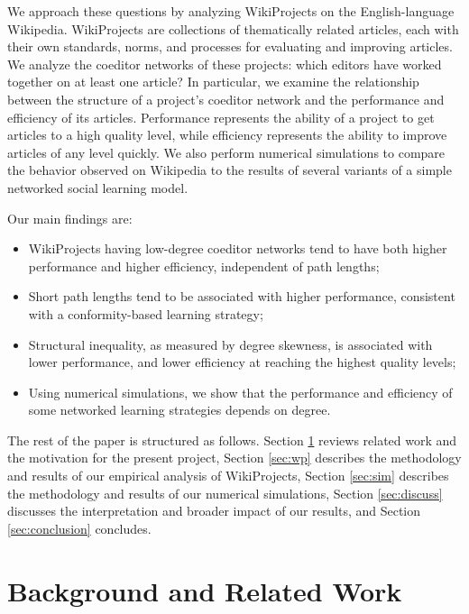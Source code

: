 We approach these questions by analyzing WikiProjects on the English-language Wikipedia.
WikiProjects are collections of thematically related articles,
each with their own standards, norms, and processes for evaluating and improving articles.
We analyze the coeditor networks of these projects: which editors have worked together on at least
one article?
In particular, we examine the relationship between the structure of a project's coeditor network
and the performance and efficiency of its articles.
Performance represents the ability of a project to get articles to a high quality level,
while efficiency represents the ability to improve articles of any level quickly.
We also perform numerical simulations to compare the behavior observed on Wikipedia to the results
of several variants of a simple networked social learning model.

Our main findings are:
\begin{itemize}
\item WikiProjects having low-degree coeditor networks tend to have both higher performance and higher efficiency, independent of path lengths;
\item Short path lengths tend to be associated with higher performance, consistent with a conformity-based learning strategy;
\item Structural inequality, as measured by degree skewness, is associated with lower performance,
and lower efficiency at reaching the highest quality levels;
\item Using numerical simulations, we show that the performance and efficiency of some networked learning strategies depends on degree.
\end{itemize}

The rest of the paper is structured as follows.
Section \ref{sec:background} reviews related work and the motivation for the present project,
Section \ref{sec:wp} describes the methodology and results of our empirical analysis of WikiProjects,
Section \ref{sec:sim} describes the methodology and results of our numerical simulations,
Section \ref{sec:discuss} discusses the interpretation and broader impact of our results,
and Section \ref{sec:conclusion} concludes.

\section{Background and Related Work}
\label{sec:background}

